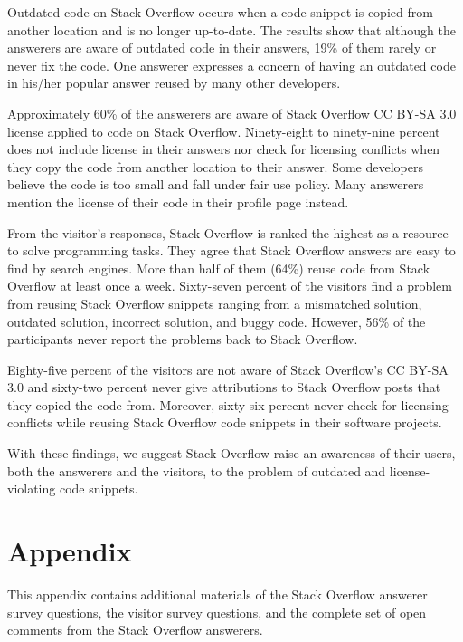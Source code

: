 \documentclass{svjour3}                     %
\begin{document}
Outdated code on Stack Overflow occurs when a code snippet is
copied from another location and is no longer up-to-date. The results show that
although the answerers are aware of outdated code in their answers, 19\% of them
rarely or never fix the code. One answerer expresses a concern of having
an outdated code in his/her popular answer reused
by many other developers.

Approximately 60\% of the answerers are aware of Stack Overflow CC BY-SA 3.0
license applied to code on Stack Overflow. Ninety-eight to ninety-nine percent
does not include license in their answers nor check for licensing conflicts when
they copy the code from another location to their answer. Some developers
believe the code is too small and fall under fair use policy. Many answerers
mention the license of their code in their profile page instead.

From the visitor's responses, Stack Overflow is ranked the highest as a resource
to solve programming tasks. They agree that Stack Overflow answers are easy to
find by search engines. More than half of them (64\%) reuse code from Stack
Overflow at least once a week. Sixty-seven percent of the visitors find a
problem from reusing Stack Overflow snippets ranging from a mismatched solution,
outdated solution, incorrect solution, and buggy code. However, 56\% of the
participants never report the problems back to Stack Overflow.

Eighty-five percent of the visitors are not aware of Stack Overflow's CC BY-SA
3.0 and sixty-two percent never give attributions to Stack Overflow posts that they copied
the code from. Moreover, sixty-six percent never check for licensing conflicts while
reusing Stack Overflow code snippets in their software projects.

With these findings, we
suggest Stack Overflow raise an awareness of their users, both the answerers and
the visitors, to the problem of outdated and license-violating code snippets.


%
%

 

\clearpage
\section{Appendix}

This appendix contains additional materials of the Stack Overflow answerer
survey questions, the visitor survey questions, and the complete set of open
comments from the Stack Overflow answerers.
\end{document}

